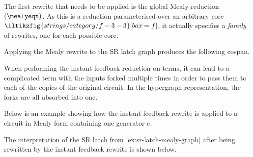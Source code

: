 The first rewrite that needs to be applied is the global Mealy reduction
\((\mealyeqn)\).
As this is a reduction parameterised over an arbitrary core \(
\iltikzfig{strings/category/f-3-3}[box=f]
\), it actually specifies a \emph{family} of rewrites, one for each possible
core.

\begin{example}\label{ex:sr-latch-mealy-graph}
    Applying the Mealy rewrite to the SR latch graph produces the following
    cospan.
    \begin{center}
    \end{center}
\end{example}

When performing the instant feedback reduction on terms, it can lead to a
complicated term with the inputs forked multiple times in order to pass them to
each of the copies of the original circuit.
In the hypergraph representation, the forks are all absorbed into one.

\begin{example}\label{ex:instant-feedback-rewrite}
    Below is an example showing how the instant feedback rewrite is applied to
    a circuit in Mealy form containing one generator \(e\).
    \begin{center}
        
    \end{center}
\end{example}

\begin{example}\label{ex:sr-latch-instant-feedback-graph}
    The interpretation of the SR latch from \cref{ex:sr-latch-mealy-graph}
    after being rewritten by the instant feedback rewrite is shown below.
    \begin{center}
    \end{center}
\end{example}


